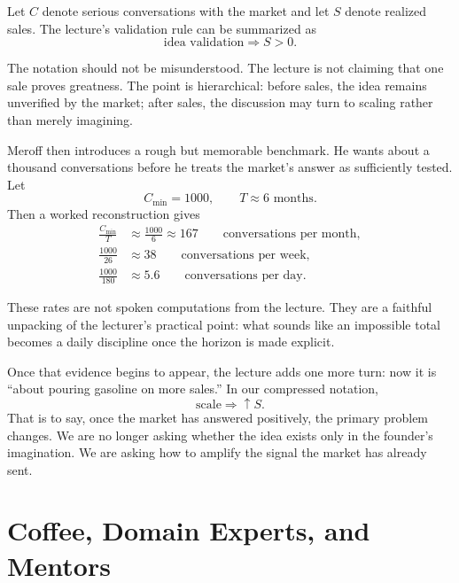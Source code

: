 \begin{definition}
Let $C$ denote serious conversations with the market and let $S$ denote realized sales. The lecture's validation rule can be summarized as
\begin{equation}
\text{idea validation} \Rightarrow S>0.
\end{equation}
\end{definition}

The notation should not be misunderstood. The lecture is not claiming that one sale proves greatness. The point is hierarchical: before sales, the idea remains unverified by the market; after sales, the discussion may turn to scaling rather than merely imagining.

Meroff then introduces a rough but memorable benchmark. He wants about a thousand conversations before he treats the market's answer as sufficiently tested. Let
\begin{equation}
C_{\min}=1000,
\qquad
T \approx 6 \text{ months}.
\end{equation}
Then a worked reconstruction gives
\begin{align}
\frac{C_{\min}}{T}
&\approx
\frac{1000}{6}
\approx
167
\qquad \text{conversations per month},\\
\frac{1000}{26}
&\approx
38
\qquad \text{conversations per week},\\
\frac{1000}{180}
&\approx
5.6
\qquad \text{conversations per day}.
\end{align}

\begin{remark}
These rates are not spoken computations from the lecture. They are a faithful unpacking of the lecturer's practical point: what sounds like an impossible total becomes a daily discipline once the horizon is made explicit.
\end{remark}

Once that evidence begins to appear, the lecture adds one more turn: now it is ``about pouring gasoline on more sales.'' In our compressed notation,
\begin{equation}
\text{scale}
\Rightarrow
\uparrow S.
\end{equation}
That is to say, once the market has answered positively, the primary problem changes. We are no longer asking whether the idea exists only in the founder's imagination. We are asking how to amplify the signal the market has already sent.

\section{Coffee, Domain Experts, and Mentors}


